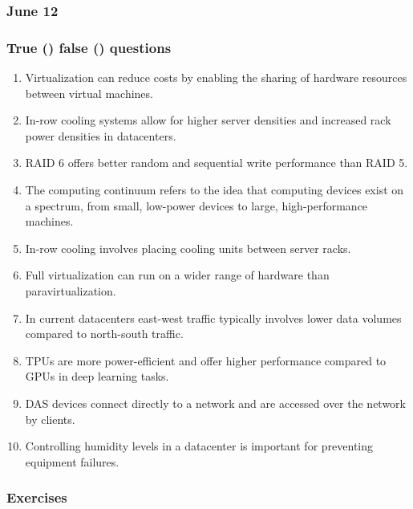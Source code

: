 \subsubsection{June 12}

\subsubsection*{True (\trueIcon) false (\falseIcon) questions}

\begin{enumerate}
    \item \trueIcon \: Virtualization can reduce costs by enabling the sharing of hardware resources between virtual machines.
    \item \trueIcon \: In-row cooling systems allow for higher server densities and increased rack power densities in datacenters.
    \item \falseIcon \: RAID 6 offers better random and sequential write performance than RAID 5.
    \item \trueIcon \: The computing continuum refers to the idea that computing devices exist on a spectrum, from small, low-power devices to large, high-performance machines.
    \item \trueIcon \: In-row cooling involves placing cooling units between server racks.
    \item \falseIcon \: Full virtualization can run on a wider range of hardware than paravirtualization.
    \item \falseIcon \: In current datacenters east-west traffic typically involves lower data volumes compared to north-south traffic.
    \item \trueIcon \: TPUs are more power-efficient and offer higher performance compared to GPUs in deep learning tasks.
    \item \falseIcon \: DAS devices connect directly to a network and are accessed over the network by clients.
    \item \trueIcon \: Controlling humidity levels in a datacenter is important for preventing equipment failures.
\end{enumerate}

\newpage

\subsubsection*{Exercises}

